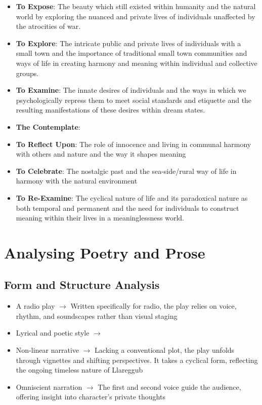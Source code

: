 		\begin{itemize}
			\item \textbf{To Expose}: The beauty which still existed within humanity and the natural world by exploring the nuanced and private lives of individuals unaffected by the atrocities of war.
			\item \textbf{To Explore}: The intricate public and private lives of individuals with a small town and the importance of traditional small town communities and ways of life in creating harmony and meaning within individual and collective groups.
			\item \textbf{To Examine}: The innate desires of individuals and the ways in which we psychologically repress them to meet social standards and etiquette and the resulting manifestations of these desires within dream states.
			\item \textbf{The Contemplate}:
			\item \textbf{To Reflect Upon}: The role of innocence and living in communal harmony with others and nature and the way it shapes meaning
			\item \textbf{To Celebrate}: The nostalgic past and the sea-side/rural way of life in harmony with the natural environment
			\item \textbf{To Re-Examine}: The cyclical nature of life and its paradoxical nature as both temporal and permanent and the need for individuals to construct meaning within their lives in a meaninglessness world.
		\end{itemize}

\section{Analysing Poetry and Prose} \label{12/05/2025}
	
	\subsection{Form and Structure Analysis}
	
		\begin{itemize}
			\item A radio play $\rightarrow$ Written specifically for radio, the play relies on voice, rhythm, and soundscapes rather than visual staging
			\item Lyrical and poetic style $\rightarrow$
			\item Non-linear narrative $\rightarrow$ Lacking a conventional plot, the play unfolds through vignettes and shifting perspectives. It takes a cyclical form, reflecting the ongoing timeless nature of Llareggub
			\item Omniscient narration $\rightarrow$ The first and second voice guide the audience, offering insight into character's private thoughts
		\end{itemize}


